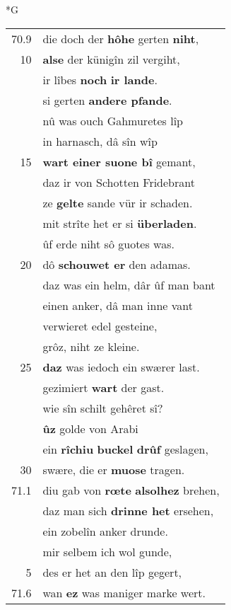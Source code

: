 \documentclass[8pt,a4paper,notitlepage]{article}
\begin{document}
\begin{table}[ht]
\begin{minipage}[t]{0.5\linewidth}
\small
\begin{center}*G
\end{center}
\begin{tabular}{rl}
70.9 & die doch der \textbf{hôhe} gerten \textbf{niht},\\ 
10 & \textbf{alse} der künigîn zil vergiht,\\ 
 & ir lîbes \textbf{noch} \textbf{ir lande}.\\ 
 & si gerten \textbf{andere pfande}.\\ 
 & nû was ouch Gahmuretes lîp\\ 
 & in harnasch, dâ sîn wîp\\ 
15 & \textbf{wart einer suone bî} gemant,\\ 
 & daz ir von Schotten Fridebrant\\ 
 & ze \textbf{gelte} sande vür ir schaden.\\ 
 & mit strîte het er si \textbf{überladen}.\\ 
 & ûf erde niht sô guotes was.\\ 
20 & dô \textbf{schouwet er} den adamas.\\ 
 & daz was ein helm, dâr ûf man bant\\ 
 & einen anker, dâ man inne vant\\ 
 & verwieret edel gesteine,\\ 
 & grôz, niht ze kleine.\\ 
25 & \textbf{daz} was iedoch ein swærer last.\\ 
 & gezimiert \textbf{wart} der gast.\\ 
 & wie sîn schilt gehêret sî?\\ 
 & \textbf{ûz} golde von Arabi\\ 
 & ein \textbf{rîchiu} \textbf{buckel} \textbf{drûf} geslagen,\\ 
30 & swære, die er \textbf{muose} tragen.\\ 
71.1 & diu gab von \textbf{rœte} \textbf{alsolhez} brehen,\\ 
 & daz man sich \textbf{drinne het} ersehen,\\ 
 & ein zobelîn anker drunde.\\ 
 & mir selbem ich wol gunde,\\ 
5 & des er het an den lîp gegert,\\ 
71.6 & wan \textbf{ez} was maniger marke wert.\\ 

\end{tabular}
\end{minipage}
\end{table}
\end{document}
